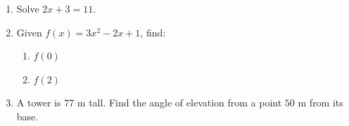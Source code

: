 \documentclass{article}\usepackage{enumitem}
\begin{document}
\begin{enumerate}[leftmargin=*, itemsep=5cm]
  \item Solve $2x + 3 = 11$.
  \item Given $f(x) = 3x^2 - 2x + 1$, find:
    \begin{enumerate}[label=(\alph*), itemsep=3cm]
      \item $f(0)$
      \item $f(2)$
    \end{enumerate}
  \item A tower is $77$ m tall. Find the angle of elevation from a point
    $50$ m from its base.
\end{enumerate}
\end{document}
